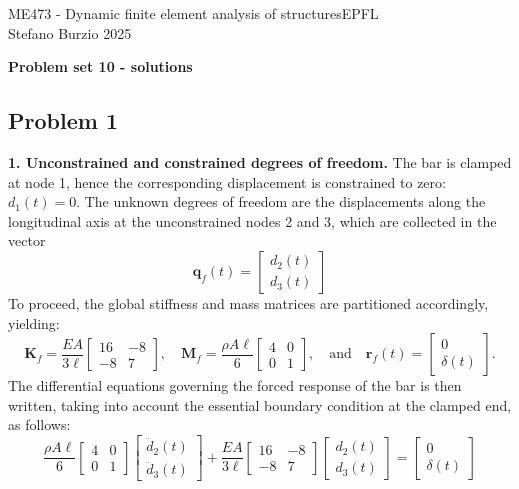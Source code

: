 \documentclass[12pt]{article}
\begin{document}
\noindent ME473 - Dynamic finite element analysis of structures\hfill EPFL\\
Stefano Burzio \hfill 2025\\
\vspace{0.3cm}

\hspace*{\fill}\textbf{\Large Problem set 10 - solutions}\hspace*{\fill}

\hrulefill

\subsection*{Problem 1}
\textbf{1. Unconstrained and constrained degrees of freedom.} The bar is clamped at node 1, hence the corresponding displacement is constrained to zero: $d_1(t) = 0$. The unknown degrees of freedom are the displacements along the longitudinal axis at the unconstrained nodes 2 and 3, which are collected in the vector
\[
    \mathbf q_f(t) = \begin{bmatrix} d_2(t) \\ d_3(t) \end{bmatrix}
\]
To proceed, the global stiffness and mass matrices are partitioned accordingly, yielding:
\[
    \mathbf{K}_f = \frac{EA}{3\ell}
    \begin{bmatrix}
        16 & -8 \\
        -8 & 7
    \end{bmatrix}, \quad
    \mathbf{M}_f = \frac{\rho A \ell}{6}
    \begin{bmatrix}
        4 & 0 \\
        0 & 1
    \end{bmatrix}, \quad\text{and}\quad
    \mathbf r_f(t) = \begin{bmatrix} 0 \\ \delta(t) \end{bmatrix}.
\]
The differential equations governing the forced response of the bar is then written, taking into account the essential boundary condition at the clamped end, as follows:
\[
    \frac{\rho A \ell}{6}
    \begin{bmatrix}
        4 & 0 \\
        0 & 1
    \end{bmatrix} \begin{bmatrix} \ddot{d}_2(t) \\ \ddot{d}_3(t) \end{bmatrix}
    + \frac{EA}{3\ell}
    \begin{bmatrix}
        16 & -8 \\
        -8 & 7
    \end{bmatrix} \begin{bmatrix} d_2(t) \\ d_3(t) \end{bmatrix}
    = \begin{bmatrix} 0 \\ \delta(t) \end{bmatrix}
\]
\end{document}
